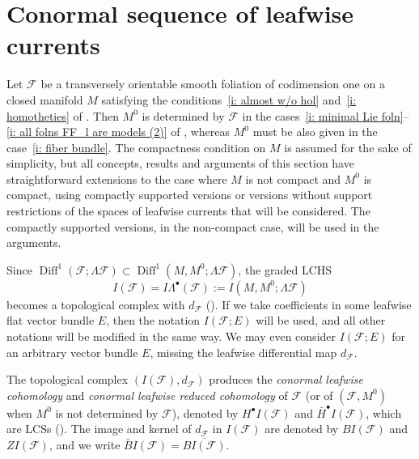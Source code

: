 \documentclass{memo-l}
\theoremstyle{plain}
\theoremstyle{definition}
\theoremstyle{remark}
\newcommand{\FF}{\mathcal{F}}
\newcommand{\Diff}{\operatorname{Diff}}
\numberwithin{section}{chapter}
\numberwithin{equation}{section}%
\begin{document}
\section{Conormal sequence of leafwise currents}\label{s: conormal seq of leafwise currents}

Let $\FF$ be a transversely orientable smooth foliation of codimension one on a closed manifold $M$ satisfying the conditions~\ref{i: almost w/o hol} and~\ref{i: homotheties} of . Then $M^0$ is determined by $\FF$ in the cases~\ref{i: minimal Lie foln}--\ref{i: all folns FF_l are models (2)} of , whereas $M^0$ must be also given in the case~\ref{i: fiber bundle}. The compactness condition on $M$ is assumed for the sake of simplicity, but all concepts, results and arguments of this section have straightforward extensions to the case where $M$ is not compact and $M^0$ is compact, using compactly supported versions or versions without support restrictions of the spaces of leafwise currents that will be considered. The compactly supported versions, in the non-compact case, will be used in the arguments.

Since $\Diff^1(\FF;\Lambda\FF)\subset\Diff^1(M,M^0;\Lambda\FF)$, the graded LCHS\index{$I(\FF)$} 
\[
I(\FF)=I\Lambda^\bullet(\FF):=I(M,M^0;\Lambda\FF)
\]
becomes a topological complex with $d_\FF$ (). If we take coefficients in some leafwise flat vector bundle $E$, then the notation $I(\FF;E)$ will be used, and all other notations will be modified in the same way. We may even consider $I(\FF;E)$ for an arbitrary vector bundle $E$, missing the leafwise differential map $d_\FF$.

The topological complex $(I(\FF),d_\FF)$ produces the \emph{conormal leafwise cohomology} and \emph{conormal leafwise reduced cohomology} of $\FF$ (or of $(\FF,M^0)$ when $M^0$ is not determined by $\FF$), denoted by $H^\bullet I(\FF)$\index{$H^\bullet I(\FF)$} and $\bar H^\bullet I(\FF)$,\index{$\bar H^\bullet I(\FF)$} which are LCSs (). The image and kernel of $d_\FF$ in $I(\FF)$ are denoted by $BI(\FF)$ and $ZI(\FF)$, and we write $\bar BI(\FF)=\overline{BI(\FF)}$.
\end{document}
